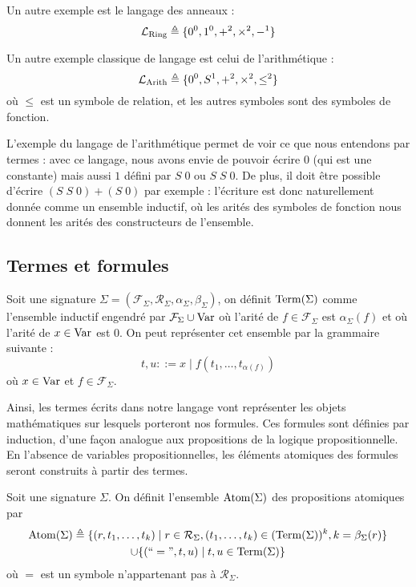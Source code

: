 \begin{example}
  Un autre exemple est le langage des anneaux :
  \[\mathcal L_{\mathrm{Ring}}\triangleq \{0^0,1^0,+^2,\times^2,-^1\}\]
\end{example}

\begin{example}
  Un autre exemple classique de langage est celui de l'arithmétique :
  \[\mathcal L_{\mathrm{Arith}}\triangleq \{0^0, S^1, +^2,\times^2,\leq^2\}\]
  où $\leq$ est un symbole de relation, et les autres symboles sont des symboles
  de fonction.
\end{example}

L'exemple du langage de l'arithmétique permet de voir ce que nous entendons par
termes : avec ce langage, nous avons envie de pouvoir écrire $0$ (qui est une
constante) mais aussi $1$ défini par $S\;0$ ou $S\;S\;0$. De plus, il doit être
possible d'écrire $(S\;S\;0) + (S\;0)$ par exemple : l'écriture est donc
naturellement donnée comme un ensemble inductif, où les arités des symboles de
fonction nous donnent les arités des constructeurs de l'ensemble.

\subsection{Termes et formules}

\begin{definition}[Termes]
  Soit une signature
  $\Sigma = (\mathcal F_\Sigma,\mathcal R_\Sigma, \alpha_\Sigma,\beta_\Sigma)$,
  on définit $\operatorname{Term}(\Sigma)$ comme l'ensemble inductif engendré par
  $\mathcal F_\Sigma\cup\operatorname{Var}$ où l'arité de $f\in\mathcal F_\Sigma$ est
  $\alpha_\Sigma(f)$ et où l'arité de $x\in \operatorname{Var}$ est $0$. On peut représenter
  cet ensemble par la grammaire suivante :
  \[t,u ::= x \mid f(t_1,\ldots,t_{\alpha(f)})\]
  où $x\in \operatorname{Var}$ et $f\in \mathcal F_\Sigma$.
\end{definition}

Ainsi, les termes écrits dans notre langage vont représenter les objets
mathématiques sur lesquels porteront nos formules. Ces formules sont définies
par induction, d'une façon analogue aux propositions de la logique
propositionnelle. En l'absence de variables propositionnelles, les éléments
atomiques des formules seront construits à partir des termes.

\begin{definition}
  Soit une signature $\Sigma$. On définit l'ensemble $\operatorname{Atom}(\Sigma)$ des
  propositions atomiques par
  \begin{multline*}
    \operatorname{Atom}(\Sigma) \triangleq \{(r,t_1,\ldots,t_k)\mid r\in\mathcal R_\Sigma,
    (t_1,\ldots,t_k) \in (\operatorname{Term}(\Sigma))^k, k = \beta_\Sigma(r)\}\\
    \cup\{(``=",t,u)\mid t,u\in \operatorname{Term}(\Sigma)\}
  \end{multline*}
  où $=$ est un symbole n'appartenant pas à $\mathcal R_\Sigma$.
\end{definition}

